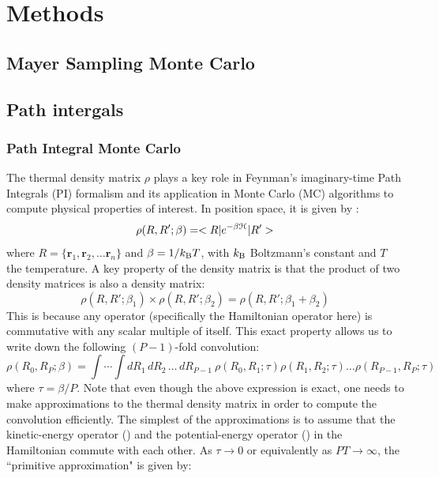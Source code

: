 \chapter{Methods}\label{chap:methods}
\section{Mayer Sampling Monte Carlo}
\section{Path intergals}
    \subsection{Path Integral Monte Carlo}
        The thermal density matrix $\rho$ plays a key role in Feynman's imaginary-time Path Integrals (PI) formalism and its application in Monte Carlo (MC) algorithms to compute physical properties of interest. In position space, it is given by \cite{Feynman,Ceperley1995,Cui1997}:
        \begin{equation} \label{rho}
            \rho (R , R' ; \beta) = < R | e^{- \beta \text{$\mathcal{H}$} } | R' >
        \end{equation}
        where $R = \{\bm{r}_1, \bm{r}_2, \ldots \bm{r}_n\}$ and $\beta = 1/k_{\rm B}T$, with $k_{\rm B}$ Boltzmann's constant and $T$ the temperature. A key property of the density matrix is that the product of two density matrices is also a density matrix:
        \begin{equation} \label{dmProduct}
            \rho (R, R'; \beta_1) \times \rho (R, R'; \beta_2) = \rho (R, R'; \beta_1 + \beta_2)
        \end{equation}
        This is because any operator (specifically the Hamiltonian operator  here) is commutative with any scalar multiple of itself. This exact property allows us to write down the following $(P-1)$-fold convolution:
        \begin{equation} \label{convolution}
            \rho (R_0, R_P; \beta) = \displaystyle\int \cdots \int dR_1 \, dR_2 \, \ldots \, dR_{P-1} \: \rho (R_0, R_1; \tau) \rho (R_1, R_2; \tau) \ldots \rho (R_{P-1}, R_P; \tau)
        \end{equation}
        where $\tau = \beta/P$. Note that even though the above expression is exact, one needs to make approximations to the thermal density matrix in order to compute the convolution efficiently. The simplest of the approximations is to assume that the kinetic-energy operator () and the potential-energy operator () in the Hamiltonian commute with each other. As $\tau \to 0$ or equivalently as $PT \to \infty$, the ``primitive approximation" is given by:
